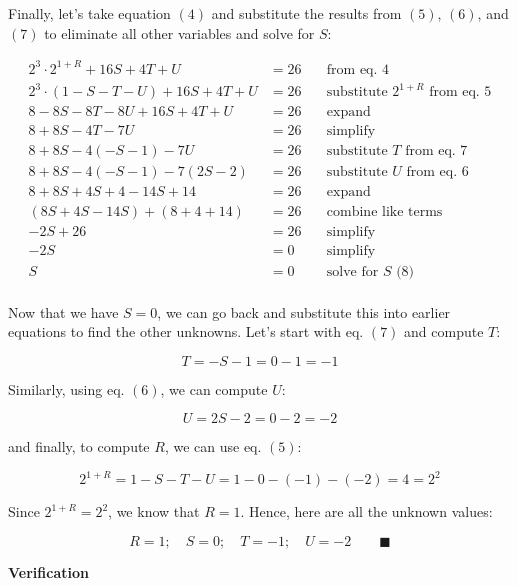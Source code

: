 Finally, let's take equation $(4)$ and substitute the results from $(5)$,
$(6)$, and $(7)$ to eliminate all other variables and solve for $S$:

$$
\begin{aligned}
2^3 \cdot 2^{1 + R} + 16S + 4T + U       & = 26 & \quad \text{from eq. 4} \\
2^3 \cdot (1 - S - T - U) + 16S + 4T + U & = 26 & \quad \text{substitute $2^{1+R}$ from eq. 5} \\
8 - 8S - 8T - 8U + 16S + 4T + U          & = 26 & \quad \text{expand} \\
8 + 8S - 4T - 7U                         & = 26 & \quad \text{simplify} \\
8 + 8S - 4(-S - 1) - 7U                  & = 26 & \quad \text{substitute $T$ from eq. 7} \\
8 + 8S - 4(-S - 1) - 7(2S -2)            & = 26 & \quad \text{substitute $U$ from eq. 6} \\
8 + 8S + 4S + 4 - 14S + 14               & = 26 & \quad \text{expand} \\
(8S + 4S - 14S) + (8 + 4 + 14)           & = 26 & \quad \text{combine like terms} \\
-2S + 26                                 & = 26 & \quad \text{simplify} \\
-2S                                      & =  0 & \quad \text{simplify} \\
S                                        & =  0 & \quad \text{solve for $S$ (8)} \\
\end{aligned}
$$

Now that we have $S = 0$, we can go back and substitute this into earlier
equations to find the other unknowns. Let's start with eq. $(7)$ and compute
$T$:

$$ T = -S - 1 = 0 - 1 = -1 $$

Similarly, using eq. $(6)$, we can compute $U$:

$$ U = 2S - 2 = 0 - 2 = - 2 $$

and finally, to compute $R$, we can use eq. $(5)$:

$$
 2^{1 + R} = 1 - S - T - U = 1 - 0 - (-1) - (-2) = 4 = 2^2
$$

Since $2^{1 + R} = 2^2$, we know that $R = 1$. Hence, here are all the unknown
values:

$$
  \boxed{R = 1; \quad S = 0; \quad T = -1; \quad U = -2} \qquad \blacksquare
$$

\textbf{Verification}


